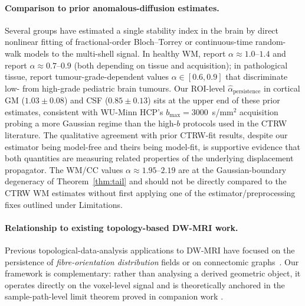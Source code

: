 \documentclass[11pt,letterpaper]{article}
\newcommand{\stab}{\alpha}
\begin{document}
\paragraph*{Comparison to prior anomalous-diffusion estimates.}
Several groups have estimated a single stability index in the brain
by direct nonlinear fitting of fractional-order Bloch--Torrey or
continuous-time random-walk models to the multi-shell signal. In
healthy WM, \citet{magin2008anomalous} report $\stab \approx
1.0$--$1.4$ and \citet{ingo2014} report $\stab \approx 0.7$--$0.9$
(both depending on tissue and acquisition); in pathological tissue,
\citet{karaman2016} report tumour-grade-dependent values
$\stab \in [0.6, 0.9]$ that discriminate low- from high-grade
pediatric brain tumours. Our ROI-level
$\widehat{\stab}_{\mathrm{persistence}}$ in cortical GM
($1.03 \pm 0.08$) and CSF ($0.85 \pm 0.13$) sits at the upper end of
these prior estimates, consistent with WU-Minn HCP's
$b_{\max}=3000$~s/mm$^2$ acquisition probing a more Gaussian regime
than the high-$b$ protocols used in the CTRW literature. The
qualitative agreement with prior CTRW-fit results, despite our
estimator being model-free and theirs being model-fit, is supportive
evidence that both quantities are measuring related properties of
the underlying displacement propagator. The WM/CC values
$\stab \approx 1.95$--$2.19$ are at the Gaussian-boundary degeneracy
of Theorem~\ref{thm:tail} and should not be directly compared to the
CTRW WM estimates without first applying one of the
estimator/preprocessing fixes outlined under Limitations.

\paragraph*{Relationship to existing topology-based DW-MRI work.}
Previous topological-data-analysis applications to DW-MRI have focused
on the persistence of \emph{fibre-orientation distribution} fields
\citep{cieslak2018,wang2025persistent} or on connectomic
graphs~\citep{sizemore2018}. Our framework is complementary: rather
than analysing a derived geometric object, it operates directly on
the voxel-level signal and is theoretically anchored in the
sample-path-level limit theorem proved in companion work
\citep{warioba2026levy}.
\end{document}

